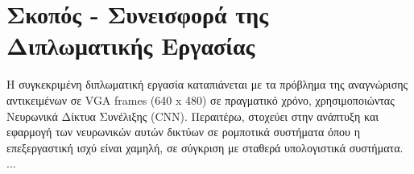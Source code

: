 \section{Σκοπός - Συνεισφορά της Διπλωματικής Εργασίας}
\label{section:contribution}

H συγκεκριμένη διπλωματική εργασία
καταπιάνεται με τα πρόβλημα της αναγνώρισης αντικειμένων σε VGA frames (640 x 480)
σε πραγματικό χρόνο, χρησιμοποιώντας Νευρωνικά Δίκτυα Συνέλιξης (CNN).
Περαιτέρω, στοχεύει στην ανάπτυξη και εφαρμογή των νευρωνικών αυτών δικτύων
σε ρομποτικά συστήματα όπου η επεξεργαστική ισχύ είναι χαμηλή, σε σύγκριση με
σταθερά υπολογιστικά συστήματα.
...


